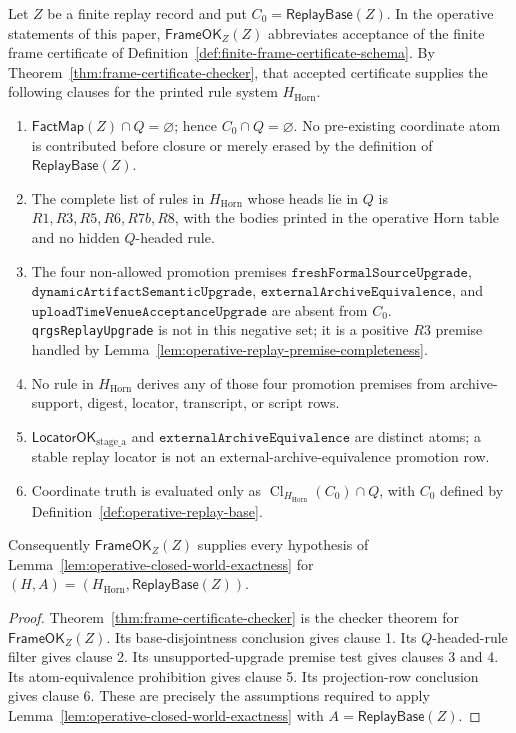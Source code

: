 \documentclass[runningheads]{llncs}
\newcommand{\LocatorOKstageA}{\mathsf{LocatorOK}_{\mathrm{stage\_a}}}
\newcommand{\FactMap}{\mathsf{FactMap}}
\newcommand{\ReplayBase}{\mathsf{ReplayBase}}
\newcommand{\FrameOKZ}{\mathsf{FrameOK}_{Z}}
\newcommand{\HHorn}{H_{\mathrm{Horn}}}
\newcommand{\ClHHorn}{\operatorname{Cl}_{\HHorn}}
\begin{document}
\begin{lemma}
\label{lem:operative-frame-expansion}
Let \(Z\) be a finite replay record and put \(C_0=\ReplayBase(Z)\).  In the
operative statements of this paper, \(\FrameOKZ(Z)\) abbreviates acceptance of
the finite frame certificate of
Definition~\ref{def:finite-frame-certificate-schema}.  By
Theorem~\ref{thm:frame-certificate-checker}, that accepted certificate supplies
the following clauses for the printed rule system \(\HHorn\).
\begin{enumerate}
\item \(\FactMap(Z)\cap Q=\varnothing\); hence
\(C_0\cap Q=\varnothing\).  No pre-existing coordinate atom is contributed
before closure or merely erased by the definition of \(\ReplayBase(Z)\).
\item The complete list of rules in \(\HHorn\) whose heads lie in
\(Q\) is \(R1,R3,R5,R6,R7b,R8\), with the bodies printed in the operative Horn
table and no hidden \(Q\)-headed rule.
\item The four non-allowed promotion premises
\(\texttt{freshFormalSourceUpgrade}\),
\(\texttt{dynamicArtifactSemanticUpgrade}\),
\(\texttt{externalArchiveEquivalence}\), and
\(\texttt{uploadTimeVenueAcceptanceUpgrade}\) are absent from \(C_0\).
\texttt{qrgsReplayUpgrade} is not in this negative set; it is a positive \(R3\)
premise handled by Lemma~\ref{lem:operative-replay-premise-completeness}.
\item No rule in \(\HHorn\) derives any of those four promotion
premises from archive-support, digest, locator, transcript, or script rows.
\item \(\LocatorOKstageA\) and
\(\texttt{externalArchiveEquivalence}\) are distinct atoms; a stable replay
locator is not an external-archive-equivalence promotion row.
\item Coordinate truth is evaluated only as
\(\ClHHorn(C_0)\cap Q\), with \(C_0\) defined by
Definition~\ref{def:operative-replay-base}.
\end{enumerate}
Consequently \(\FrameOKZ(Z)\) supplies every hypothesis of
Lemma~\ref{lem:operative-closed-world-exactness} for
\((H,A)=(\HHorn,\ReplayBase(Z))\).
\end{lemma}

\begin{proof}
Theorem~\ref{thm:frame-certificate-checker} is the checker theorem for
\(\FrameOKZ(Z)\).  Its base-disjointness conclusion gives clause 1.  Its
\(Q\)-headed-rule filter gives clause 2.  Its unsupported-upgrade premise test
gives clauses 3 and 4.  Its atom-equivalence prohibition gives clause 5.  Its
projection-row conclusion gives clause 6.  These are precisely the assumptions
required to apply Lemma~\ref{lem:operative-closed-world-exactness} with
\(A=\ReplayBase(Z)\).
\end{proof}
\end{document}
